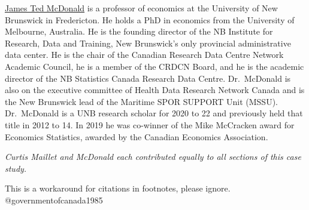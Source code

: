 \href{https://www.unb.ca/faculty-staff/directory/arts-fr-economics/mcdonald-ted.html}{James Ted McDonald} is a professor of economics at the University of New Brunswick in Fredericton. He holds a PhD in economics from the University of Melbourne, Australia. He is the founding director of the NB Institute for Research, Data and Training, New Brunswick's only provincial administrative data center. He is the chair of the Canadian Research Data Centre Network Academic Council, he is a member of the CRDCN Board, and he is the academic director of the NB Statistics Canada Research Data Centre. Dr.~McDonald is also on the executive committee of Health Data Research Network Canada and is the New Brunswick lead of the Maritime SPOR SUPPORT Unit (MSSU). Dr.~McDonald is a UNB research scholar for 2020 to 22 and previously held that title in 2012 to 14. In 2019 he was co-winner of the Mike McCracken award for Economics Statistics, awarded by the Canadian Economics Association.

\emph{Curtis Maillet and McDonald each contributed equally to all sections of this case study.}

\begin{invisible}
This is a workaround for citations in footnotes, please ignore.
@governmentofcanada1985
\end{invisible}

\putbib

